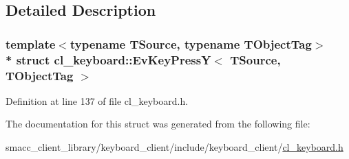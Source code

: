 \subsection{Detailed Description}
\subsubsection*{template$<$typename T\+Source, typename T\+Object\+Tag$>$\\*
struct cl\+\_\+keyboard\+::\+Ev\+Key\+Press\+Y$<$ T\+Source, T\+Object\+Tag $>$}



Definition at line 137 of file cl\+\_\+keyboard.\+h.



The documentation for this struct was generated from the following file\+:\begin{DoxyCompactItemize}
\item 
smacc\+\_\+client\+\_\+library/keyboard\+\_\+client/include/keyboard\+\_\+client/\hyperlink{cl__keyboard_8h}{cl\+\_\+keyboard.\+h}\end{DoxyCompactItemize}
